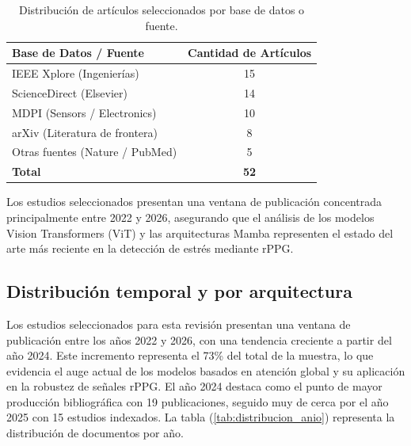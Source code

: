 \begin{table}[htbp]
    \centering
    \caption{Distribución de artículos seleccionados por base de datos o fuente.}
    \label{tab:distribucion_fuentes}
    \begin{tabular}{|l|c|}
        \hline
        \textbf{Base de Datos / Fuente} & \textbf{Cantidad de Artículos} \\ \hline
        IEEE Xplore (Ingenierías)       & 15                             \\ \hline
        ScienceDirect (Elsevier)        & 14                             \\ \hline
        MDPI (Sensors / Electronics)    & 10                             \\ \hline
        arXiv (Literatura de frontera)  & 8                              \\ \hline
        Otras fuentes (Nature / PubMed) & 5                              \\ \hline
        \textbf{Total}                  & \textbf{52}                    \\ \hline
    \end{tabular}
\end{table}

Los estudios seleccionados presentan una ventana de publicación concentrada principalmente entre 2022 y 2026, asegurando que el análisis de los modelos Vision 
Transformers (ViT) y las arquitecturas Mamba representen el estado del arte más reciente en la detección de estrés mediante rPPG.

\subsection{Distribución temporal y por arquitectura}

Los estudios seleccionados para esta revisión presentan una ventana de publicación entre los años 2022 y 2026, con una tendencia creciente a partir del año 2024. 
Este incremento representa el 73\% del total de la muestra, lo que evidencia el auge actual de los modelos basados en atención global y su aplicación en la 
robustez de señales rPPG. El año 2024 destaca como el punto de mayor producción bibliográfica con 19 publicaciones, seguido muy de cerca por el año 2025 con 15 
estudios indexados. La tabla (\ref{tab:distribucion_anio}) representa la distribución de documentos por año.\\

